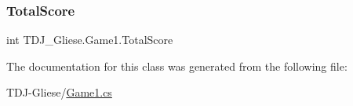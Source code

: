 \subsubsection{\texorpdfstring{Total\+Score}{TotalScore}}
{\footnotesize\ttfamily int T\+D\+J\+\_\+\+Gliese.\+Game1.\+Total\+Score}



The documentation for this class was generated from the following file\+:\begin{DoxyCompactItemize}
\item 
T\+D\+J-\/\+Gliese/\hyperlink{_game1_8cs}{Game1.\+cs}\end{DoxyCompactItemize}
